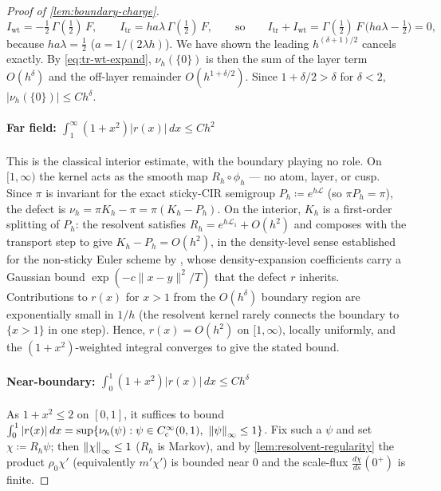 \documentclass[aap,preprint]{imsart}
\DeclarePairedDelimiter{\Vpair}{\|}{\|} %
\newcommand\norm[2][0pt]{\Vpair*{#2}} %
\newcommand\snorm[1]{\norm{\smash{#1}}} %
\numberwithin{equation}{section}
\theoremstyle{plain}
\theoremstyle{definition}
\begin{document}
\begin{proof}[Proof of \cref{lem:boundary-charge}]
\[
  I_{\mathrm{wt}}=-\tfrac12\,\Gamma(\tfrac12)\,F,
  \qquad
  I_{\mathrm{tr}}=h a\lambda\,\Gamma(\tfrac12)\,F,
  \qquad\text{so}\qquad
  I_{\mathrm{tr}}+I_{\mathrm{wt}}=\Gamma(\tfrac12)\,F\,\bigl(h a\lambda-\tfrac12\bigr)=0,
\]
because $ha\lambda=\tfrac12$ ($a=1/(2\lambda h)$). We have shown the leading $h^{(\delta+1)/2}$ cancels exactly.  By \eqref{eq:tr-wt-expand}, $\nu_h(\{0\})$ is then the sum of the layer term $O(h^\delta)$ and the off-layer remainder $O(h^{1+\delta/2})$.  Since $1+\delta/2>\delta$ for $\delta<2$,  $|\nu_h(\{0\})|\le Ch^\delta$.

\paragraph{Far field: $\int_1^\infty(1+x^2)|r(x)|\,dx\le Ch^2$}
This is the classical interior estimate, with the boundary playing no role.  On $[1,\infty)$ the kernel acts as the smooth map $R_h\circ\phi_h$ --- no atom, layer, or cusp.  Since $\pi$ is invariant for the exact sticky-CIR semigroup $P_h\coloneqq e^{h\mathcal L}$ (so $\pi P_h=\pi$), the defect is $\nu_h=\pi K_h-\pi=\pi(K_h-P_h)$.  On the interior, $K_h$ is a first-order splitting of $P_h$: the resolvent satisfies $R_h=e^{h\mathcal L_1}+O(h^2)$ and composes with the transport step to give $K_h-P_h=O(h^2)$, in the density-level sense established for the non-sticky Euler scheme by \citet[Cor.~2.1]{BallyTalay1996b}, whose density-expansion coefficients carry a Gaussian bound $\exp(-c\|x-y\|^2/T)$ that the defect $r$ inherits.  Contributions to $r(x)$ for $x>1$ from the $O(h^\delta)$ boundary region are exponentially small in $1/h$ (the resolvent kernel rarely connects the boundary to $\{x>1\}$ in one step).  Hence, $r(x)=O(h^2)$ on $[1,\infty)$, locally uniformly, and the $(1+x^2)$-weighted integral converges to give the stated bound.  

\paragraph{Near-boundary: $\int_0^1(1+x^2)|r(x)|\,dx\le Ch^\delta$}
As $1+x^2\le2$ on $[0,1]$, it suffices to bound $\int_0^1|r(x)|\,dx=\sup\{\nu_h(\psi):\psi\in C_{\mathrm c}^\infty(0,1),\ \snorm{\psi}_\infty\le1\}$.  Fix such a $\psi$ and set $\chi\coloneqq R_h\psi$; then $\snorm{\chi}_\infty\le1$ ($R_h$ is Markov), and by \cref{lem:resolvent-regularity} the product $\rho_0\chi'$ (equivalently $m'\chi'$) is bounded near $0$ and the scale-flux $\tfrac{d\chi}{ds}(0^+)$ is finite.


\end{proof}
\end{document}
